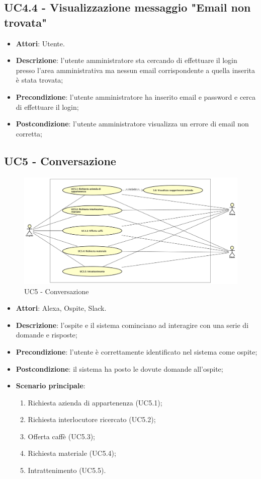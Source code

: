 \documentclass[../AnalisiDeiRequisiti.tex]{subfiles}
\begin{document}
\subsection{UC4.4 - Visualizzazione messaggio "Email non trovata"} 
\label{sssec:UC4.4} 
\begin{itemize} 
\item \textbf{Attori}: Utente.
\item \textbf{Descrizione}: l'utente amministratore sta cercando di effettuare il login presso l'area amministrativa ma nessun email corrispondente a quella inserita è stata trovata;
\item \textbf{Precondizione}: l'utente amministratore ha inserito email e password e cerca di effettuare il login;
\item \textbf{Postcondizione}: l'utente amministratore visualizza un errore di email non corretta;
\end{itemize} 
\subsection{UC5 - Conversazione} 
\label{sssec:UC5}
\begin{figure}[!h]
	\centering
	\includegraphics[width=\textwidth]{UseCases/UC5_Conversazione/UC5_Conversazione.png}
	\caption{UC5 - Conversazione}
\end{figure}
\begin{itemize} 
\item \textbf{Attori}: Alexa, Ospite, Slack.
\item \textbf{Descrizione}: l'ospite e il sistema cominciano ad interagire con una serie di domande e risposte;
\item \textbf{Precondizione}: l'utente è correttamente identificato nel sistema come ospite;
\item \textbf{Postcondizione}: il sistema ha posto le dovute domande all'ospite;
\item \textbf{Scenario principale}: \begin{enumerate}\item Richiesta azienda di appartenenza (UC5.1);\item Richiesta interlocutore ricercato (UC5.2);\item Offerta caffè (UC5.3);\item Richiesta materiale (UC5.4);\item Intrattenimento (UC5.5). 
 \end{enumerate}
\end{itemize} 
\end{document}
